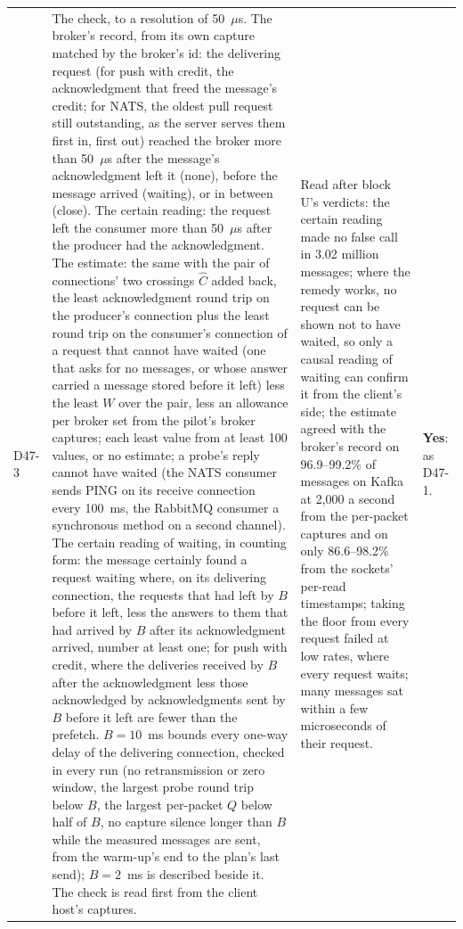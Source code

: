 \documentclass[11pt]{article}
\begin{document}
{\begin{longtable}{@{}p{1.1cm} >{\raggedright\arraybackslash}p{6.1cm} >{\raggedright\arraybackslash}p{6.0cm} >{\raggedright\arraybackslash}p{2.2cm}@{}}
D47-3 & The check, to a resolution of 50~$\mu$s. The broker's record, from its own capture matched by the broker's id: the delivering request (for push with credit, the acknowledgment that freed the message's credit; for NATS, the oldest pull request still outstanding, as the server serves them first in, first out) reached the broker more than 50~$\mu$s after the message's acknowledgment left it (none), before the message arrived (waiting), or in between (close). The certain reading: the request left the consumer more than 50~$\mu$s after the producer had the acknowledgment. The estimate: the same with the pair of connections' two crossings $\hat{C}$ added back, the least acknowledgment round trip on the producer's connection plus the least round trip on the consumer's connection of a request that cannot have waited (one that asks for no messages, or whose answer carried a message stored before it left) less the least $W$ over the pair, less an allowance per broker set from the pilot's broker captures; each least value from at least 100 values, or no estimate; a probe's reply cannot have waited (the NATS consumer sends PING on its receive connection every 100~ms, the RabbitMQ consumer a synchronous method on a second channel). The certain reading of waiting, in counting form: the message certainly found a request waiting where, on its delivering connection, the requests that had left by $B$ before it left, less the answers to them that had arrived by $B$ after its acknowledgment arrived, number at least one; for push with credit, where the deliveries received by $B$ after the acknowledgment less those acknowledged by acknowledgments sent by $B$ before it left are fewer than the prefetch. $B = 10$~ms bounds every one-way delay of the delivering connection, checked in every run (no retransmission or zero window, the largest probe round trip below $B$, the largest per-packet $Q$ below half of $B$, no capture silence longer than $B$ while the measured messages are sent, from the warm-up's end to the plan's last send); $B = 2$~ms is described beside it. The check is read first from the client host's captures. & Read after block U's verdicts: the certain reading made no false call in 3.02 million messages; where the remedy works, no request can be shown not to have waited, so only a causal reading of waiting can confirm it from the client's side; the estimate agreed with the broker's record on 96.9--99.2\% of messages on Kafka at 2,000 a second from the per-packet captures and on only 86.6--98.2\% from the sockets' per-read timestamps; taking the floor from every request failed at low rates, where every request waits; many messages sat within a few microseconds of their request. & \textbf{Yes}: as D47-1. \\

\end{longtable}}
\end{document}
